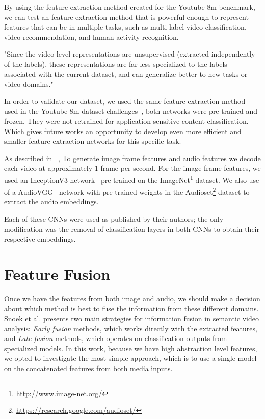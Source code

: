 By using the feature extraction method created for the Youtube-8m benchmark, we can test an feature extraction method that is powerful enough to represent features that can be in multiple tasks, such as multi-label video classification, video recommendation, and human activity recognition.

"Since the video-level representations are unsupervised (extracted independently of the labels), these representations are far less specialized to the labels associated with the current dataset, and can generalize better to new tasks or video domains."~\cite{abu2016youtube}

In order to validate our dataset, we used the same feature extraction method used in the Youtube-8m dataset challenges~\cite{abu2016youtube}, both networks were pre-trained and frozen. They were not retrained for application sensitive content classification. Which gives future works an opportunity to develop even more efficient and smaller feature extraction networks for this specific task.


As described in ~\cite{abu2016youtube},
To generate image frame features and audio features we decode each video at approximately 1 frame-per-second. For the image frame features, we used an InceptionV3  network~\cite{szegedy2016rethinking} pre-trained on the ImageNet\footnote{\url{http://www.image-net.org/}} dataset. We also use of a AudioVGG~\cite{hershey2017cnn} network with pre-trained weights in the Audioset\footnote{\url{https://research.google.com/audioset/}} dataset to extract the audio embeddings.

Each of these CNNs were used as published by their authors; the only modification was the removal of classification layers in both CNNs to obtain their respective embeddings.

\section{Feature Fusion}
\label{sec:feature_fusion}

Once we have the features from both image and audio, we should make a decision about which method is best to fuse the information from these different domains. Snoek et al. \cite{snoek2005featurefusion} presents two main strategies for information fusion in semantic video analysis: \emph{Early fusion} methods, which works directly with the extracted features, and \emph{Late fusion} methods, which operates on classification outputs from specialized models.
In this work, because we have high abstraction level features, we opted to investigate the most simple approach, which is to use a single model on the concatenated features from both media inputs.

